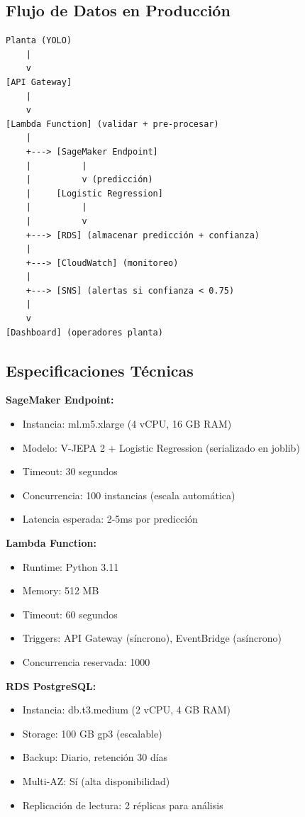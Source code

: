 \documentclass[11pt,letterpaper]{article}
\begin{document}
\subsection{Flujo de Datos en Producción}

\begin{verbatim}
Planta (YOLO)
    |
    v
[API Gateway]
    |
    v
[Lambda Function] (validar + pre-procesar)
    |
    +---> [SageMaker Endpoint]
    |          |
    |          v (predicción)
    |     [Logistic Regression]
    |          |
    |          v
    +---> [RDS] (almacenar predicción + confianza)
    |
    +---> [CloudWatch] (monitoreo)
    |
    +---> [SNS] (alertas si confianza < 0.75)
    |
    v
[Dashboard] (operadores planta)
\end{verbatim}

\subsection{Especificaciones Técnicas}

\textbf{SageMaker Endpoint:}
\begin{itemize}
  \item Instancia: ml.m5.xlarge (4 vCPU, 16 GB RAM)
  \item Modelo: V-JEPA 2 + Logistic Regression (serializado en joblib)
  \item Timeout: 30 segundos
  \item Concurrencia: 100 instancias (escala automática)
  \item Latencia esperada: 2-5ms por predicción
\end{itemize}

\textbf{Lambda Function:}
\begin{itemize}
  \item Runtime: Python 3.11
  \item Memory: 512 MB
  \item Timeout: 60 segundos
  \item Triggers: API Gateway (síncrono), EventBridge (asíncrono)
  \item Concurrencia reservada: 1000
\end{itemize}

\textbf{RDS PostgreSQL:}
\begin{itemize}
  \item Instancia: db.t3.medium (2 vCPU, 4 GB RAM)
  \item Storage: 100 GB gp3 (escalable)
  \item Backup: Diario, retención 30 días
  \item Multi-AZ: Sí (alta disponibilidad)
  \item Replicación de lectura: 2 réplicas para análisis
\end{itemize}
\end{document}
